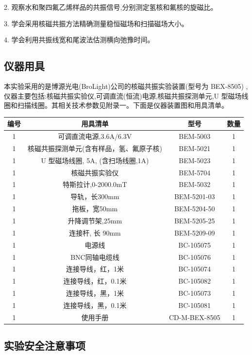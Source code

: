 \documentclass{ctexart}
\begin{document}
2. 观察水和聚四氟乙烯样品的共振信号,分别测定氢核和氟核的旋磁比。

3. 学会采用核磁共振方法精确测量稳恒磁场和扫描磁场大小。

4. 学会利用共振线宽和尾波法估测横向弛豫时间。

\subsection{仪器用具}
本实验采用的是博源光电(BroLight)公司的核磁共振实验装置(型号为 BEX-8505)
,仪器主要包括:核磁共振实验仪,可调直流(恒流)电源,核磁共振探测单元,U 型磁场线圈和扫描线圈。其相关技术参数见附录一。下面是仪器装置图和用具清单。

\begin{tabular}{c|c|c|c}
	\hline
        编号 & 用具清单 &型号& 数量 \\
	\hline 
	1& 可调直流电源,3.6A/6.3V & BEM-5003 &1 \\
        1& 核磁共振探测单元(含有样品，氢、氟原子核)& BEM-5021 &1 \\
        1&  U 型磁场线圈, 5A, (含扫场线圈,1A)& BEM-5023 &1 \\
        1& 核磁共振实验仪 & BEM-5704 &1 \\
        1& 特斯拉计,0-2000.0mT& BEM-5032 &1 \\
        1& 导轨，长300mm & BEM-5201-03 &1 \\
        1& 拖板，宽50mm & BEM-5204-50 &1 \\
        1& 升降调节架,25mm & BEM-5205-25 &1 \\
        1& 连接杆, 长 90mm & BEM-5209-09 &1 \\
        1& 电源线 & BC-105075 &1 \\
        1& BNC同轴电缆线 & BC-105076 &1 \\
        1& 连接导线，红，1米 & BC-105074 &1 \\
        1& 连接导线，红，0.1米 & BC-105082 &1 \\
        1& 连接导线，黑，1米 & BC-105073 &1 \\
        1& 连接导线，黑，0.1米 & BC-105081 &1 \\
        1& 使用手册 & CD-M-BEX-8505 &1 \\
	\hline
\end{tabular}


\subsection{实验安全注意事项}
\end{document}
